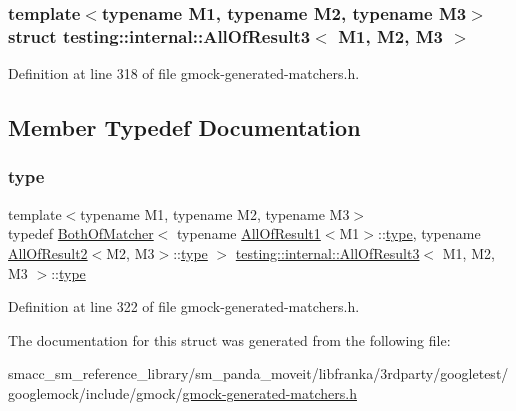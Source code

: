 \subsubsection*{template$<$typename M1, typename M2, typename M3$>$\newline
struct testing\+::internal\+::\+All\+Of\+Result3$<$ M1, M2, M3 $>$}



Definition at line 318 of file gmock-\/generated-\/matchers.\+h.



\subsection{Member Typedef Documentation}
\mbox{\label{structtesting_1_1internal_1_1AllOfResult3_a18073a23acd542bccf3a6c5d7f72f957}} 
\subsubsection{\texorpdfstring{type}{type}}
{\footnotesize\ttfamily template$<$typename M1, typename M2, typename M3$>$ \\
typedef \hyperlink{classtesting_1_1internal_1_1BothOfMatcher}{Both\+Of\+Matcher}$<$ typename \hyperlink{structtesting_1_1internal_1_1AllOfResult1}{All\+Of\+Result1}$<$M1$>$\+::\hyperlink{structtesting_1_1internal_1_1AllOfResult3_a18073a23acd542bccf3a6c5d7f72f957}{type}, typename \hyperlink{structtesting_1_1internal_1_1AllOfResult2}{All\+Of\+Result2}$<$M2, M3$>$\+::\hyperlink{structtesting_1_1internal_1_1AllOfResult3_a18073a23acd542bccf3a6c5d7f72f957}{type} $>$ \hyperlink{structtesting_1_1internal_1_1AllOfResult3}{testing\+::internal\+::\+All\+Of\+Result3}$<$ M1, M2, M3 $>$\+::\hyperlink{structtesting_1_1internal_1_1AllOfResult3_a18073a23acd542bccf3a6c5d7f72f957}{type}}



Definition at line 322 of file gmock-\/generated-\/matchers.\+h.



The documentation for this struct was generated from the following file\+:\begin{DoxyCompactItemize}
\item 
smacc\+\_\+sm\+\_\+reference\+\_\+library/sm\+\_\+panda\+\_\+moveit/libfranka/3rdparty/googletest/googlemock/include/gmock/\hyperlink{gmock-generated-matchers_8h}{gmock-\/generated-\/matchers.\+h}\end{DoxyCompactItemize}
